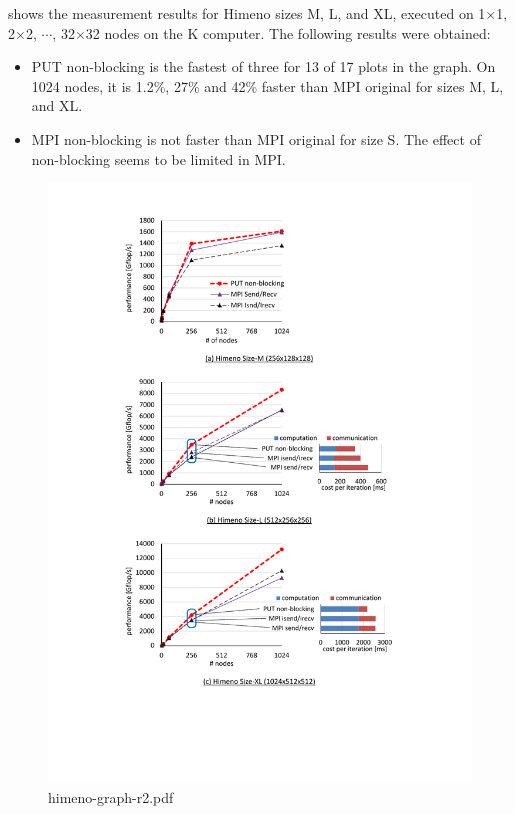  shows the measurement results for Himeno sizes M, L, and XL,
executed on 1$\times$1, 2$\times$2, $\cdots$, 32$\times$32 nodes on the
K computer. The following results were obtained:
\begin{itemize}
\item
PUT non-blocking is the fastest of three for 13 of 17 plots in the graph. On 
1024 nodes, it is 1.2\%, 27\% and 42\% faster than MPI original for sizes M, 
L, and XL.

\item
MPI non-blocking is not faster than MPI original for size S. The effect of 
non-blocking seems to be limited in MPI.

\end{itemize}

\begin{figure}[p]
  \begin{center}
    \mbox{\includegraphics[trim=37mm 34mm 37mm 4mm, scale=0.8,clip]{figs/himeno-graph-r2.pdf}}
    \caption{himeno-graph-r2.pdf}\label{fig:himeno-graph}
  \end{center}
\end{figure}


